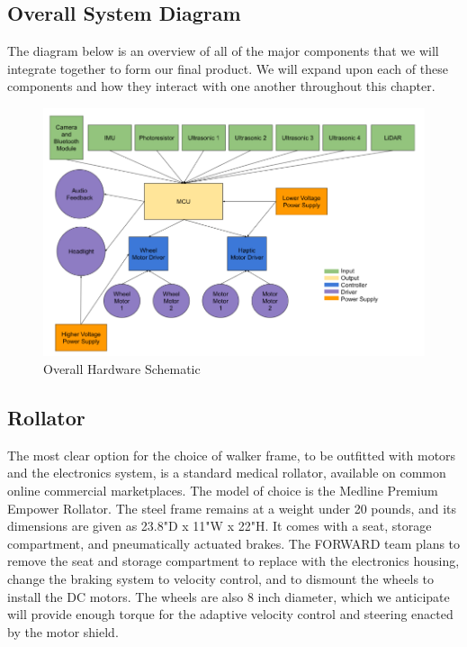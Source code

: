 \subsection{Overall System Diagram}
\noindent The diagram below is an overview of all of the major components that we will integrate together to form our final product. We will expand upon each of these components and how they interact with one another throughout this chapter.\\

\begin{figure}[H]
	\centering
	\includegraphics[width=1\textwidth]{./Images/overall.png}
	\caption{\label{fig:overall}Overall Hardware Schematic}
\end{figure}

\subsection{Rollator}
\noindent The most clear option for the choice of walker frame, to be outfitted with motors and the electronics system, is a standard medical rollator, available on common online commercial marketplaces. The model of choice is the Medline Premium Empower Rollator. The steel frame remains at a weight under 20 pounds, and its dimensions are given as 23.8"D x 11"W x 22"H. It comes with a seat, storage compartment, and pneumatically actuated brakes. The FORWARD team plans to remove the seat and storage compartment to replace with the electronics housing, change the braking system to velocity control, and to dismount the wheels to install the DC motors. The wheels are also 8 inch diameter, which we anticipate will provide enough torque for the adaptive velocity control and steering enacted by the motor shield.\\

